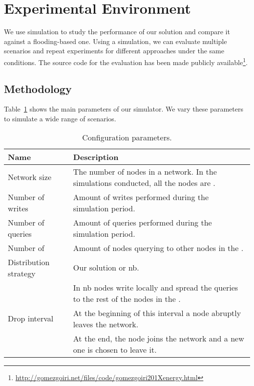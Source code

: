 \section{Experimental Environment}
\label{environment}
We use simulation to study the performance of our solution and compare it against a flooding-based one.
Using a simulation, we can evaluate multiple scenarios and repeat experiments for different approaches under the same conditions.
The source code for the evaluation has been made publicly available\footnote{\url{http://gomezgoiri.net/files/code/gomezgoiri201Xenergy.html}}.

\subsection{Methodology}
Table~\ref{tab:configurationParameters} shows the main parameters of our simulator.
We vary these parameters to simulate a wide range of scenarios.


\begin{table}
  \centering
    \begin{tabular}{l p{7cm}}
      \hline
      Name & Description \\
      \hline
      Network size & The number of nodes in a network. In the simulations conducted, all the nodes are \providers{}. \\
      Number of writes & Amount of writes performed during the simulation period. \\
      Number of queries & Amount of queries performed during the simulation period. \\
      Number of \consumers{} & Amount of nodes querying to other nodes in the \Space{}. \\
      Distribution strategy & Our solution or \ac{nb}. \\
      & In \ac{nb} nodes write locally and spread the queries to the rest of the nodes in the \Space{}. \\
      Drop interval & At the beginning of this interval a node abruptly leaves the network. \\
      & At the end, the node joins the network and a new one is chosen to leave it. \\
      \hline
    \end{tabular}
    \caption {Configuration parameters.}
  \label{tab:configurationParameters}
\end{table}

